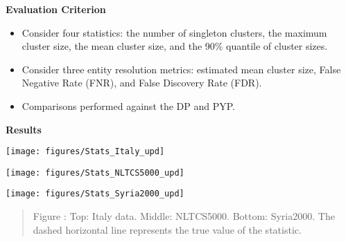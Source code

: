 \documentclass[portrait,a0b,final]{a0poster}
\newenvironment{poster}{
  \begin{center}
  \begin{minipage}[c]{0.98\textwidth}
}{
  \end{minipage}
  \end{center}
}
\newcommand{\mycaption}[1]{
  \vspace{0.25cm}
  \begin{quote}
    {{\sc Figure} \arabic{figure}: #1}
  \end{quote}
  \vspace{0.25cm}
  \stepcounter{figure}
}
\begin{document}
\begin{poster}
\begin{multicols}{3}
\begin{center}
\textbf{Evaluation Criterion}
\end{center}

\begin{itemize}
\item Consider four statistics: the number of
singleton clusters, the maximum cluster size, the mean cluster size,
and the 90\% quantile of cluster sizes. 
\item Consider three entity resolution metrics: estimated mean cluster size, False Negative Rate (FNR), and False Discovery Rate (FDR). 
\item Comparisons performed against the DP and PYP. 
\end{itemize}

\begin{center}
\textbf{Results}
\end{center}

\begin{center}
\texttt{[image: figures/Stats\_Italy\_upd]}

\vspace{-1cm}

\texttt{[image: figures/Stats\_NLTCS5000\_upd]}

\vspace{-1cm}

\texttt{[image: figures/Stats\_Syria2000\_upd]}
\vspace{-0.5cm}
\mycaption{Top: Italy data. Middle: NLTCS5000. Bottom: Syria2000. The dashed horizontal line represents the true value of the statistic.}
\end{center}


\end{multicols}
\end{poster}
\end{document}
